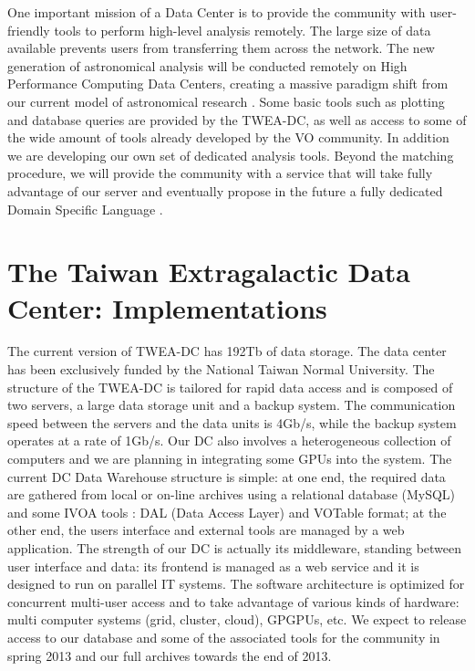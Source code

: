 One important mission of a Data Center is to provide the community with user-friendly tools to perform high-level analysis remotely. The large size of data available prevents users from transferring them across the network. The new generation of astronomical analysis will be conducted remotely on High Performance Computing Data Centers, creating a massive paradigm shift from our current model of astronomical research \citep[the {\it Fourth Paradigm} -][]{fourthpar}. Some basic tools such as plotting and database queries are provided by the TWEA-DC, as well as access to some of the wide amount of tools already developed by the VO community. In addition we are developing our own set of dedicated analysis tools. Beyond the matching procedure, we will provide the community with a service that will take fully advantage of our server and eventually propose in the future a fully dedicated Domain Specific Language \citep{O18_adassxxii}.

\section{The Taiwan Extragalactic Data Center: Implementations}

The current version of TWEA-DC has 192Tb of data storage. The data center has been exclusively funded by the National Taiwan Normal University.  The structure of the TWEA-DC is tailored for rapid data access and is composed of two servers, a large data storage unit and a backup system. The communication speed between the servers and the data units is 4Gb/s, while the backup system operates at a rate of 1Gb/s. Our DC also involves a heterogeneous collection of computers and we are planning in integrating some GPUs into the system. The current DC Data Warehouse structure is simple: at one end, the required data are gathered from local or on-line archives using a relational database (MySQL) and some IVOA tools : DAL (Data Access Layer) and VOTable format; at the other end, the users interface and external tools are managed by a web application. The strength of our DC is actually its middleware, standing between user interface and data: its frontend is managed as a web service and it is designed to run on parallel IT systems. The software architecture is optimized for concurrent multi-user access and to take advantage of various kinds of hardware: multi computer systems (grid, cluster, cloud), GPGPUs, etc. We expect to release access to our database and some of the associated tools for the community in spring 2013 and our full archives towards the end of 2013.\\

